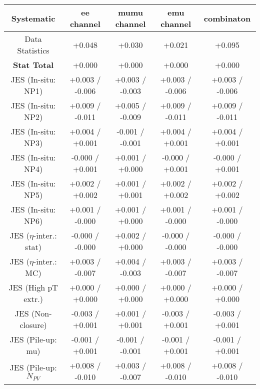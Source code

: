 \begin{table}[htbp]
\scriptsize
  \begin{center} 
  \begin{tabular}{|c|c|c|c|c|}
  \hline
Systematic                            &  ee channel&  mumu channel&  emu channel&  combinaton\\
  \hline
Data Statistics                       &+0.048              & +0.030              & +0.021              & +0.095             \\
\hline
\textbf{Stat Total}                   &+0.000              & +0.000              & +0.000              & +0.000             \\
\hline
JES (In-situ: NP1)                    &+0.003   / -0.006   & +0.003   / -0.003   & +0.003   / -0.006   & +0.003   / -0.006  \\
JES (In-situ: NP2)                    &+0.009   / -0.011   & +0.005   / -0.009   & +0.009   / -0.011   & +0.009   / -0.011  \\
JES (In-situ: NP3)                    &+0.004   / +0.001   & -0.001   / -0.001   & +0.004   / +0.001   & +0.004   / +0.001  \\
JES (In-situ: NP4)                    &-0.000   / +0.001   & +0.001   / +0.000   & -0.000   / +0.001   & -0.000   / +0.001  \\
JES (In-situ: NP5)                    &+0.002   / +0.002   & +0.001   / +0.001   & +0.002   / +0.002   & +0.002   / +0.002  \\
JES (In-situ: NP6)                    &+0.001   / -0.000   & +0.001   / +0.000   & +0.001   / -0.000   & +0.001   / -0.000  \\
JES ($\eta$-inter.: stat)               &-0.000   / -0.000   & +0.002   / +0.000   & -0.000   / -0.000   & -0.000   / -0.000  \\
JES ($\eta$-inter.: MC)                 &+0.003   / -0.007   & +0.004   / -0.003   & +0.003   / -0.007   & +0.003   / -0.007  \\
JES (High pT extr.)                  &+0.000   / +0.000   & +0.000   / +0.000   & +0.000   / +0.000   & +0.000   / +0.000  \\
JES (Non-closure)                     &-0.003   / +0.001   & +0.001   / +0.001   & -0.003   / +0.001   & -0.003   / +0.001  \\
JES (Pile-up: mu)                     &-0.001   / +0.001   & -0.001   / -0.001   & -0.001   / +0.001   & -0.001   / +0.001  \\
JES (Pile-up: $N_{PV}$                  &+0.008   / -0.010   & +0.003   / -0.007   & +0.008   / -0.010   & +0.008   / -0.010  \\

\end{tabular}
\end{center}
\end{table}
